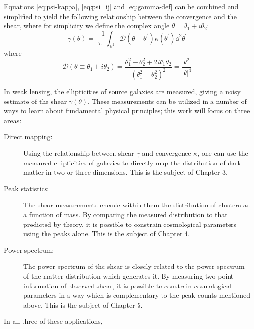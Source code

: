 Equations \ref{eq:psi-kappa}, \ref{eq:psi_ij} and \ref{eq:gamma-def} can be combined and simplified to yield the following relationship between the convergence and the shear, where for simplicity we define the complex angle $\theta = \theta_1 + i\theta_2$:
\begin{equation}
  \label{eq:gamma-kappa}
  \gamma(\theta) 
  = \frac{-1}{\pi}\int_{\mathbb{R}^2} \mathcal{D}(\theta - 
  \theta^\prime)\kappa(\theta^\prime) \dd^2\theta^\prime
\end{equation}
where 
\begin{equation}
  \label{eq:scriptD}
  \mathcal{D}(\theta \equiv \theta_1+i\theta_2) 
  = \frac{\theta_1^2 - \theta_2^2 + 2i\theta_1\theta_2}{(\theta_1^2+\theta_2^2)^2}
  = \frac{\theta^2}{|\theta|^4}
\end{equation}

In weak lensing, the ellipticities of source galaxies are measured, 
giving a noisy estimate of the shear $\gamma(\theta)$.
These measurements can be utilized in a number of ways to learn about
fundamental physical principles; this work will focus on three areas:
\begin{description}
  \item[Direct mapping:] Using the relationship between shear $\gamma$ and
    convergence $\kappa$, one can use the measured ellipticities of galaxies
    to directly map the distribution of dark matter in two or three dimensions.
    This is the subject of Chapter 3.
  \item[Peak statistics:] The shear measurements encode within them the
    distribution of clusters as a function of mass.  By comparing the
    measured distribution to that predicted by theory, it is possible to
    constrain cosmological parameters using the peaks alone.  This is
    the subject of Chapter 4.
  \item[Power spectrum:] The power spectrum of the shear is closely related
    to the power spectrum of the matter distribution which generates it.
    By measuring two point information of observed shear, it is possible
    to constrain cosmological parameters in a way which is complementary
    to the peak counts mentioned above.  This is the subject of Chapter 5.
\end{description}

In all three of these applications, 

